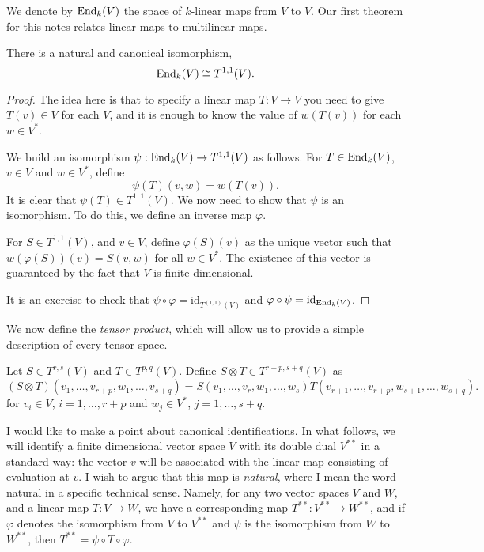 We denote by $\operatorname{End}_k(V)$ the space of $k$-linear maps from $V$ to $V$. Our
first theorem for this notes relates linear maps to multilinear maps.
\begin{proposition}
    There is a natural and canonical isomorphism,
    \begin{equation*}
        \operatorname{End}_k(V) \cong T^{1,1}(V).
    \end{equation*}
\end{proposition}
\begin{proof}
    The idea here is that to specify a linear map $T:V\rightarrow V$
    you need to give $T(v) \in V$ for each $V$, and it is enough
    to know the value of $w(T(v))$ for each $w \in V^*$.

    We build an isomorphism $\psi:\operatorname{End}_k(V)\rightarrow T^{1,1}(V)$ as follows. 
    For $T \in \operatorname{End}_k(V)$, $v \in V$ and $w \in V^*$, define
    \begin{equation*}
        \psi(T)(v,w) = w(T(v)).
    \end{equation*}
    It is clear that $\psi(T) \in T^{1,1}(V)$. We now need to show that $\psi$ is
    an isomorphism. To do this, we define an inverse map $\varphi$. 

    For $S \in T^{1,1}(V)$, and $v \in V$, define $\varphi(S)(v)$
    as the unique vector such that $w(\varphi(S))(v) = S(v,w)$ for
    all $w \in V^*$. The existence of this vector is guaranteed by 
    the fact that $V$ is finite dimensional.

    It is an exercise to check that $\psi\circ \varphi = \mathrm{id}_{T^{(1,1)}(V)}$
    and $\varphi \circ \psi = \mathrm{id}_{\operatorname{End}_k(V)}$.
\end{proof}

We now define the \emph{tensor product}, which will allow
us to provide a simple description of every tensor space. 
\begin{definition}
    Let $S \in T^{r,s}(V)$ and $T \in T^{p,q}(V)$. Define $S \otimes T \in T^{r+p,s+q}(V)$
    as
    \begin{equation*}
        (S\otimes T)(v_1,\ldots,v_{r+p},w_1,\ldots,v_{s+q}) = S(v_1,\ldots,v_r,w_1,\ldots,w_s)T(v_{r+1},\ldots,v_{r+p},w_{s+1},\ldots,w_{s+q}).
    \end{equation*}
    for $v_i \in V$, $i = 1,\ldots,r+p$ and $w_j\in V^*$, $j = 1,\ldots,s+q$.
\end{definition}

I would like to make a point about canonical identifications. In what follows,
we will identify a finite dimensional vector space $V$ with its double dual $V^{**}$
in a standard way: the vector $v$ will be associated with the linear map consisting
of evaluation at $v$. I wish to argue that this map is \emph{natural}, where I mean 
the word natural in a specific technical sense. Namely, for any two vector
spaces $V$ and $W$, and a linear map $T:V\rightarrow W$, we have a corresponding
map $T^{**}:V^{**}\rightarrow W^{**}$, and if $\varphi$ denotes the isomorphism from
$V$ to $V^{**}$ and $\psi$ is the isomorphism from $W$ to $W^{**}$, then $T^{**} = \psi \circ T \circ \varphi$.

